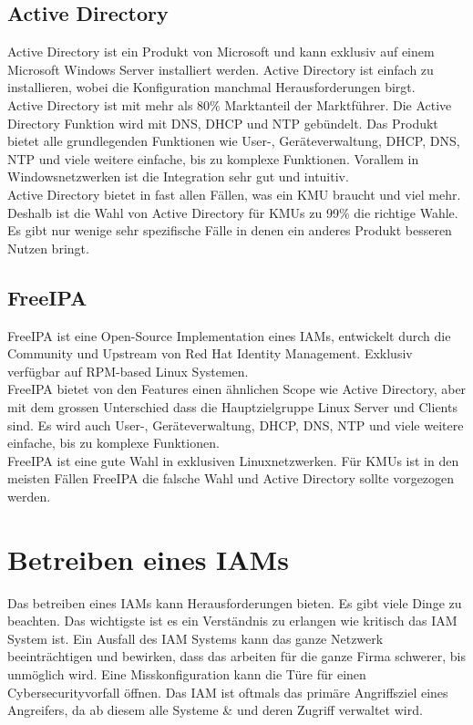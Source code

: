\subsection{Active Directory}
Active Directory ist ein Produkt von Microsoft und kann exklusiv auf einem Microsoft Windows Server installiert werden. Active Directory ist einfach zu installieren, wobei die Konfiguration manchmal Herausforderungen birgt.\\

Active Directory ist mit mehr als 80\% Marktanteil der Marktführer. Die Active Directory Funktion wird mit DNS, DHCP und NTP gebündelt. Das Produkt bietet alle grundlegenden Funktionen wie User-, Geräteverwaltung, DHCP, DNS, NTP und viele weitere einfache, bis zu komplexe Funktionen. Vorallem in Windowsnetzwerken ist die Integration sehr gut und intuitiv.\\

Active Directory bietet in fast allen Fällen, was ein KMU braucht und viel mehr. Deshalb ist die Wahl von Active Directory für KMUs zu 99\% die richtige Wahle. Es gibt nur wenige sehr spezifische Fälle in denen ein anderes Produkt besseren Nutzen bringt. 


\subsection{FreeIPA}
FreeIPA ist eine Open-Source Implementation eines IAMs, entwickelt durch die Community und Upstream von Red Hat Identity Management. Exklusiv verfügbar auf RPM-based Linux Systemen.\\

FreeIPA bietet von den Features einen ähnlichen Scope wie Active Directory, aber mit dem grossen Unterschied dass die Hauptzielgruppe Linux Server und Clients sind. Es wird auch User-, Geräteverwaltung, DHCP, DNS, NTP und viele weitere einfache, bis zu komplexe Funktionen.\\

FreeIPA ist eine gute Wahl in exklusiven Linuxnetzwerken. Für KMUs ist in den meisten Fällen FreeIPA die falsche Wahl und Active Directory sollte vorgezogen werden.


\section{Betreiben eines IAMs}
Das betreiben eines IAMs kann Herausforderungen bieten.
Es gibt viele Dinge zu beachten.
Das wichtigste ist es ein Verständnis zu erlangen wie kritisch das IAM System ist.
Ein Ausfall des IAM Systems kann das ganze Netzwerk beeinträchtigen und bewirken, dass das arbeiten für die ganze Firma schwerer, bis unmöglich wird.
Eine Misskonfiguration kann die Türe für einen Cybersecurityvorfall öffnen.
Das IAM ist oftmals das primäre Angriffsziel eines Angreifers, da ab diesem alle Systeme \& und deren Zugriff verwaltet wird.\\

